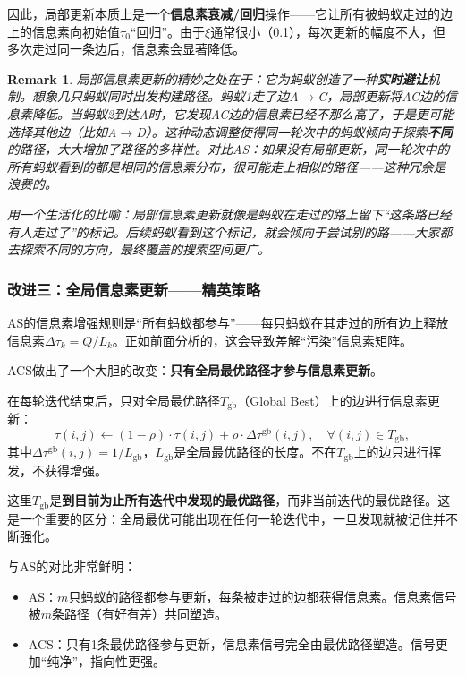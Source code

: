 \documentclass[lang=cn,zihao=-4,a4paper,fontset=windows]{beautybook}
\newtheorem*{remark}{\textbf{Remark}}
\begin{document}
因此，局部更新本质上是一个\textbf{信息素衰减/回归}操作——它让所有被蚂蚁走过的边上的信息素向初始值$\tau_0$“回归”。由于$\xi$通常很小（0.1），每次更新的幅度不大，但多次走过同一条边后，信息素会显著降低。

\begin{remark}
局部信息素更新的精妙之处在于：它为蚂蚁创造了一种\textbf{实时避让}机制。想象几只蚂蚁同时出发构建路径。蚂蚁1走了边A$\to$C，局部更新将AC边的信息素降低。当蚂蚁2到达A时，它发现AC边的信息素已经不那么高了，于是更可能选择其他边（比如A$\to$D）。这种动态调整使得同一轮次中的蚂蚁倾向于探索\textbf{不同}的路径，大大增加了路径的多样性。对比AS：如果没有局部更新，同一轮次中的所有蚂蚁看到的都是相同的信息素分布，很可能走上相似的路径——这种冗余是浪费的。

用一个生活化的比喻：局部信息素更新就像是蚂蚁在走过的路上留下“这条路已经有人走过了”的标记。后续蚂蚁看到这个标记，就会倾向于尝试别的路——大家都去探索不同的方向，最终覆盖的搜索空间更广。
\end{remark}

\subsubsection{改进三：全局信息素更新——精英策略}

AS的信息素增强规则是“所有蚂蚁都参与”——每只蚂蚁在其走过的所有边上释放信息素$\Delta\tau_k = Q/L_k$。正如前面分析的，这会导致差解“污染”信息素矩阵。

ACS做出了一个大胆的改变：\textbf{只有全局最优路径才参与信息素更新}。

\begin{definition}[][ACS全局信息素更新]
在每轮迭代结束后，只对全局最优路径$T_{\text{gb}}$（Global Best）上的边进行信息素更新：
\[
\tau(i,j) \leftarrow (1 - \rho) \cdot \tau(i,j) + \rho \cdot \Delta\tau^{\text{gb}}(i,j), \quad \forall (i,j) \in T_{\text{gb}},
\]
其中$\Delta\tau^{\text{gb}}(i,j) = 1/L_{\text{gb}}$，$L_{\text{gb}}$是全局最优路径的长度。不在$T_{\text{gb}}$上的边只进行挥发，不获得增强。
\end{definition}

这里$T_{\text{gb}}$是\textbf{到目前为止所有迭代中发现的最优路径}，而非当前迭代的最优路径。这是一个重要的区分：全局最优可能出现在任何一轮迭代中，一旦发现就被记住并不断强化。

与AS的对比非常鲜明：
\begin{itemize}
    \item AS：$m$只蚂蚁的路径都参与更新，每条被走过的边都获得信息素。信息素信号被$m$条路径（有好有差）共同塑造。
    \item ACS：只有1条最优路径参与更新，信息素信号完全由最优路径塑造。信号更加“纯净”，指向性更强。
\end{itemize}
\end{document}
